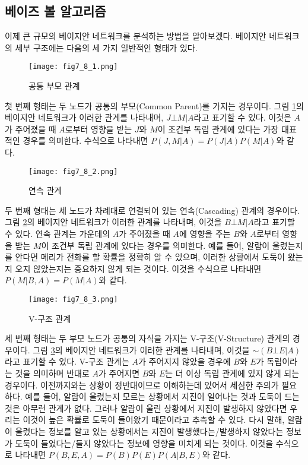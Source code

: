\documentclass[a4paper]{oblivoir}
\begin{document}
\subsection{베이즈 볼 알고리즘}

이제 큰 규모의 베이지안 네트워크를 분석하는 방법을 알아보겠다. 베이지안 네트워크의 세부 구조에는 다음의 세 가지 일반적인 형태가 있다. \\

\begin{figure}[ht] \centering 
\texttt{[image: fig7\_8\_1.png]} 
\caption{공통 부모 관계}
\label{fig:7-8-1}
\end{figure} 

첫 번째 형태는 두 노드가 공통의 부모(Common Parent)를 가지는 경우이다. 그림 \ref{fig:7-8-1}의 베이지안 네트워크가 이러한 관계를 나타내며, $J \bot M | A$라고 표기할 수 있다. 이것은 $A$가 주어졌을 때 $A$로부터 영향을 받는 $J$와 $M$이 조건부 독립 관계에 있다는 가장 대표적인 경우를 의미한다. 수식으로 나타내면 $P(J,M|A)=P(J|A)P(M|A)$와 같다. \\

\begin{figure}[ht] \centering 
\texttt{[image: fig7\_8\_2.png]} 
\caption{연속 관계}
\label{fig:7-8-2}
\end{figure} 

두 번째 형태는 세 노드가 차례대로 연결되어 있는 연속(Cascading) 관계의 경우이다. 그림 \ref{fig:7-8-2}의 베이지안 네트워크가 이러한 관계를 나타내며, 이것을 $B \bot M | A$라고 표기할 수 있다. 연속 관계는 가운데의 $A$가 주어졌을 때 $A$에 영향을 주는 $B$와 $A$로부터 영향을 받는 $M$이 조건부 독립 관계에 있다는 경우를 의미한다. 예를 들어, 알람이 울렸는지를 안다면 메리가 전화를 할 확률을 정확히 알 수 있으며, 이러한 상황에서 도둑이 왔는지 오지 않았는지는 중요하지 않게 되는 것이다. 이것을 수식으로 나타내면 $P(M|B,A)=P(M|A)$와 같다. \\

\begin{figure}[ht] \centering 
\texttt{[image: fig7\_8\_3.png]} 
\caption{V-구조 관계}
\label{fig:7-8-3}
\end{figure} 

세 번째 형태는 두 부모 노드가 공통의 자식을 가지는 V-구조(V-Structure) 관계의 경우이다. 그림 \ref{fig:7-8-3}의 베이지안 네트워크가 이러한 관계를 나타내며, 이것을 $\sim(B \bot E | A)$라고 표기할 수 있다. V-구조 관계는 $A$가 주어지지 않았을 경우에 $B$와 $E$가 독립이라는 것을 의미하며 반대로 $A$가 주어지면 $B$와 $E$는 더 이상 독립 관계에 있지 않게 되는 경우이다. 이전까지와는 상황이 정반대이므로 이해하는데 있어서 세심한 주의가 필요하다. 예를 들어, 알람이 울렸는지 모르는 상황에서 지진이 일어나는 것과 도둑이 드는 것은 아무런 관계가 없다. 그러나 알람이 울린 상황에서 지진이 발생하지 않았다면 우리는 이것이 높은 확률로 도둑이 들어왔기 때문이라고 추측할 수 있다. 다시 말해, 알람이 울렸다는 정보를 알고 있는 상황에서는 지진이 발생했다는/발생하지 않았다는 정보가 도둑이 들었다는/들지 않았다는 정보에 영향을 미치게 되는 것이다. 이것을 수식으로 나타내면 $P(B,E,A) = P(B) P(E) P(A|B,E)$와 같다. \\
\end{document}
